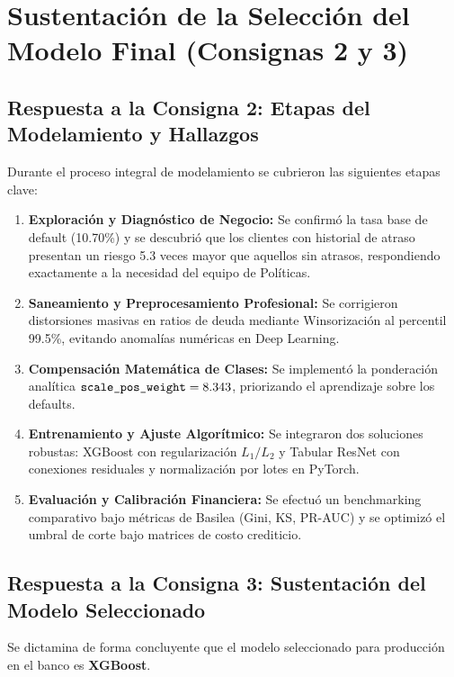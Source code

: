 \documentclass[11pt,a4paper]{article}
\begin{document}
\section{Sustentación de la Selección del Modelo Final (Consignas 2 y 3)}

\subsection{Respuesta a la Consigna 2: Etapas del Modelamiento y Hallazgos}
Durante el proceso integral de modelamiento se cubrieron las siguientes etapas clave:
\begin{enumerate}
    \item \textbf{Exploración y Diagnóstico de Negocio:} Se confirmó la tasa base de default (10.70\%) y se descubrió que los clientes con historial de atraso presentan un riesgo 5.3 veces mayor que aquellos sin atrasos, respondiendo exactamente a la necesidad del equipo de Políticas.
    \item \textbf{Saneamiento y Preprocesamiento Profesional:} Se corrigieron distorsiones masivas en ratios de deuda mediante Winsorización al percentil 99.5\%, evitando anomalías numéricas en Deep Learning.
    \item \textbf{Compensación Matemática de Clases:} Se implementó la ponderación analítica $\text{\texttt{scale\_pos\_weight}} = 8.343$, priorizando el aprendizaje sobre los defaults.
    \item \textbf{Entrenamiento y Ajuste Algorítmico:} Se integraron dos soluciones robustas: XGBoost con regularización $L_1/L_2$ y Tabular ResNet con conexiones residuales y normalización por lotes en PyTorch.
    \item \textbf{Evaluación y Calibración Financiera:} Se efectuó un benchmarking comparativo bajo métricas de Basilea (Gini, KS, PR-AUC) y se optimizó el umbral de corte bajo matrices de costo crediticio.
\end{enumerate}

\subsection{Respuesta a la Consigna 3: Sustentación del Modelo Seleccionado}
Se dictamina de forma concluyente que el modelo seleccionado para producción en el banco es \textbf{XGBoost}. 
\end{document}
